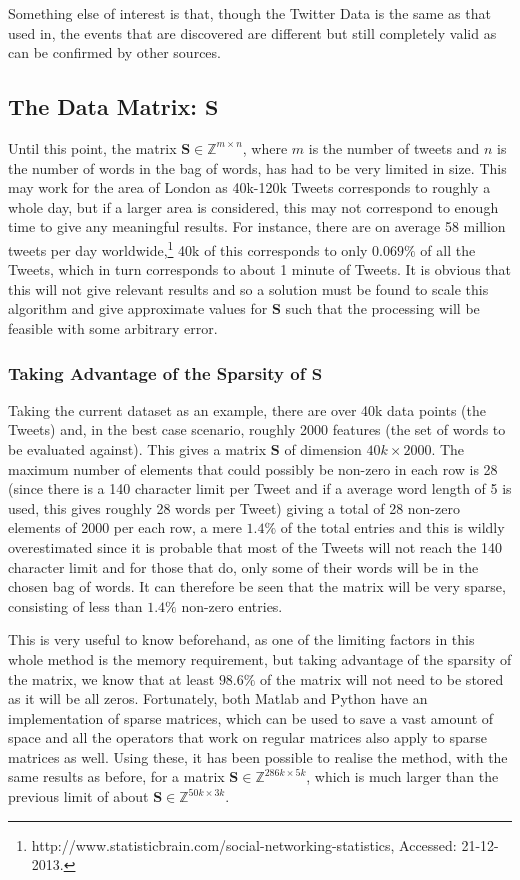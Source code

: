 \documentclass[11pt,a4paper]{article}
\newcommand{\smat}{\mathbf{S}}
\begin{document}
Something else of interest is that, though the Twitter Data is the same as that used in,\cite{microblogs} the events that are discovered are different but still completely valid as can be confirmed by other sources. 

\subsection{The Data Matrix: $\smat$}
Until this point, the matrix $\mathbf{S} \in \mathbb{Z}^{m \times n}$, where $m$ is the number of tweets and $n$ is the number of words in the bag of words, has had to be very limited in size. This may work for the area of London as 40k-120k Tweets corresponds to roughly a whole day, but if a larger area is considered, this may not correspond to enough time to give any meaningful results. For instance,  there are on average 58 million tweets per day worldwide,\footnote{http://www.statisticbrain.com/social-networking-statistics, Accessed: 21-12-2013. } 40k of this corresponds to only $0.069\%$ of all the Tweets, which in turn corresponds to about 1 minute of Tweets. It is obvious that this will not give relevant results and so a solution must be found to scale this algorithm and give approximate values for $\mathbf{S}$ such that the processing will be feasible with some arbitrary error. 

\subsubsection{Taking Advantage of the Sparsity of $\mathbf{S}$}
\label{sparsity_matrix}

Taking the current dataset as an example, there are over 40k data points (the Tweets) and, in the best case scenario, roughly 2000 features (the set of words to be evaluated against). This gives a matrix $\mathbf{S}$ of dimension $40k\times 2000$. 
The maximum number of elements that could possibly be non-zero in each row is 28 (since there is a 140 character limit per Tweet and if a average word length of 5 is used, this gives roughly 28 words per Tweet) giving a total of 28 non-zero elements of 2000 per each row, a mere $1.4\%$ of the total entries and this is wildly overestimated since it is probable that most of the Tweets will not reach the 140 character limit and for those that do, only some of their words will be in the chosen bag of words. It can therefore be seen that the matrix will be very sparse, consisting of less than $1.4\%$ non-zero entries.

This is very useful to know beforehand, as one of the limiting factors in this whole method is the memory requirement, but taking advantage of the sparsity of the matrix, we know that at least $98.6\%$ of the matrix will not need to be stored as it will be all zeros. Fortunately, both Matlab and Python have an implementation of sparse matrices, which can be used to save a vast amount of space and all the operators that work on regular matrices also apply to sparse matrices as well. Using these, it has been possible to realise the method, with the same results as before, for a matrix $\mathbf{S} \in \mathbb{Z}^{286k\times5k}$, which is much larger than the previous limit of about $\mathbf{S} \in \mathbb{Z}^{50k\times3k}$.
\end{document}
